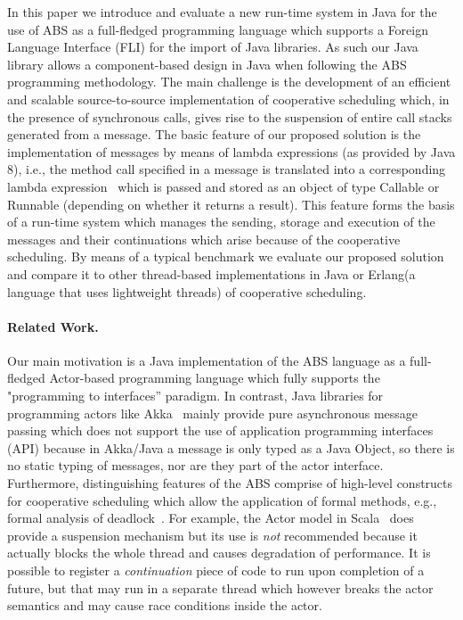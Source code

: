 In this paper we introduce and evaluate a new run-time system in Java for the use of ABS as a full-fledged programming language which supports a Foreign Language Interface (FLI) for the import of Java libraries. As such our Java library allows a component-based design in Java when following the ABS programming methodology.
The main challenge is the development of an efficient and scalable source-to-source implementation of cooperative scheduling which, in the presence of synchronous calls, gives rise to the suspension of entire call stacks generated from a message.
The basic feature of our proposed solution is the implementation of messages by means of lambda expressions (as provided by Java 8), i.e., the method call specified in a message
is translated into a corresponding lambda expression~\cite{lambdas} which is passed and stored as
an object of type Callable or Runnable (depending on whether it returns a result).
This feature forms the basis of a run-time system which manages
the sending, storage and execution of the messages and their continuations
which arise because of the cooperative scheduling.
By means of a typical benchmark we evaluate our proposed solution and compare it
to other thread-based implementations in Java or Erlang(a language that uses lightweight threads) of cooperative scheduling.

\paragraph{Related Work.} Our main motivation is a Java implementation of the ABS language as a full-fledged Actor-based programming language which fully supports the "programming to interfaces'' paradigm.
In contrast, Java libraries for programming actors like Akka~\cite{Akka} mainly provide pure asynchronous message passing which does not support the use of application programming interfaces (API) because in Akka/Java a message is only typed as a Java Object, so there is no static typing of messages, nor are they part of the actor interface.
Furthermore, distinguishing features of the ABS comprise of high-level constructs for cooperative scheduling which allow the application of formal methods, e.g.,
formal analysis of deadlock~\cite{deadlock}.
For example, the Actor model in Scala~\cite{Scala} does provide a suspension mechanism but its use is \emph{not} recommended because it actually blocks the whole thread and causes
degradation of performance.
It is possible to register a {\em continuation} piece of code to run upon completion of a future, but that may run in a separate thread which however breaks the actor semantics and may cause race conditions inside the actor.

